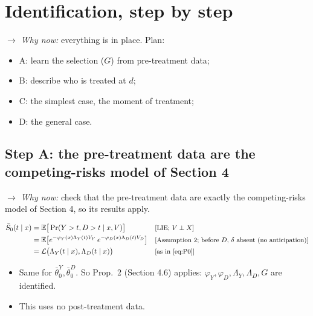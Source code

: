 \documentclass[11pt]{article}
\newcommand{\E}{\mathbb{E}}
\newcommand{\1}{\mathbf{1}}
\newcommand{\Lap}{\mathcal{L}}
\newcommand{\why}[1]{\text{\small[#1]}}
\newcommand{\whynow}[1]{\par\noindent\textit{$\rightarrow$ Why now:} #1\par}
\begin{document}
\section{Identification, step by step}
\whynow{everything is in place. Plan:}
\begin{itemize}
  \item A: learn the selection ($G$) from pre-treatment data;
  \item B: describe who is treated at $d$;
  \item C: the simplest case, the moment of treatment;
  \item D: the general case.
\end{itemize}

\subsection{Step A: the pre-treatment data are the competing-risks model of Section 4}
\whynow{check that the pre-treatment data are exactly the competing-risks model of Section 4, so its results apply.}
\begin{align}
  \bar S_0(t\mid x) &= \E\big[\Pr(Y>t,D>t\mid x,V)\big] && \why{LIE; $V\perp X$} \nonumber\\
  &= \E\big[e^{-\varphi_Y(x)\Lambda_Y(t)V_Y}\,e^{-\varphi_D(x)\Lambda_D(t)V_D}\big] && \why{Assumption 2; before $D$, $\delta$ absent (no anticipation)} \nonumber\\
  &= \Lap\big(\Lambda_Y(t\mid x),\Lambda_D(t\mid x)\big) && \why{as in \eqref{eq:P0}} \nonumber
\end{align}
\begin{itemize}
  \item Same for $\bar\theta^Y_0,\bar\theta^D_0$. So Prop.~2 (Section 4.6) applies: $\varphi_Y,\varphi_D,\Lambda_Y,\Lambda_D,G$ are identified.
  \item This uses no post-treatment data.
\end{itemize}
\end{document}
